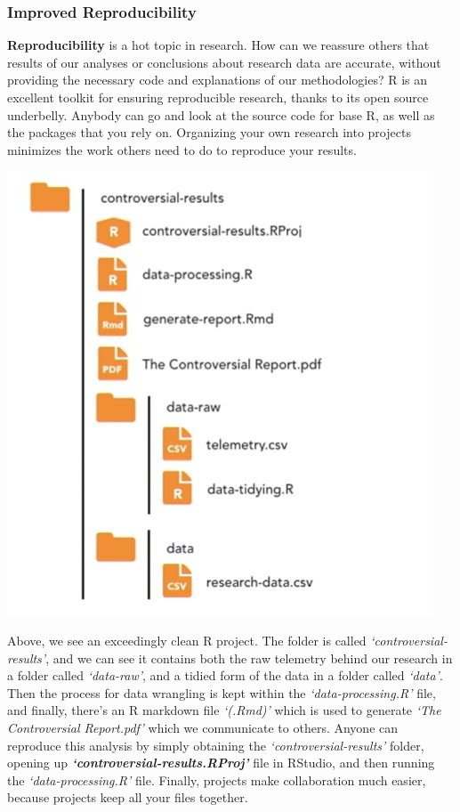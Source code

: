 \documentclass[
]{article}
\begin{document}
\hypertarget{improved-reproducibility}{%
\subsubsection{Improved Reproducibility}\label{improved-reproducibility}}

\textbf{Reproducibility} is a hot topic in research. How can we reassure others that results of our analyses or conclusions about research data are accurate, without providing the necessary code and explanations of our methodologies? R is an excellent toolkit for ensuring reproducible research, thanks to its open source underbelly. Anybody can go and look at the source code for base R, as well as the packages that you rely on. Organizing your own research into projects minimizes the work others need to do to reproduce your results.

\includegraphics{Capture01.JPG}

Above, we see an exceedingly clean R project. The folder is called \emph{`controversial-results'}, and we can see it contains both the raw telemetry behind our research in a folder called \emph{`data-raw'}, and a tidied form of the data in a folder called \emph{`data'}. Then the process for data wrangling is kept within the \emph{`data-processing.R'} file, and finally, there's an R markdown file \emph{`(.Rmd)'} which is used to generate \emph{`The Controversial Report.pdf'} which we communicate to others. Anyone can reproduce this analysis by simply obtaining the \emph{`controversial-results'} folder, opening up \textbf{\emph{`controversial-results.RProj'}} file in RStudio, and then running the \emph{`data-processing.R'} file. Finally, projects make collaboration much easier, because projects keep all your files together.
\end{document}
